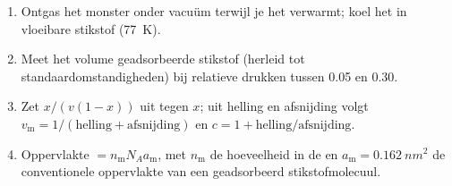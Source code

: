 \begin{method}\label{met:b3:surfaces-catalysis:bet-area}
\begin{enumerate}
  \item Ontgas het monster onder vacuüm terwijl je het verwarmt; koel het in
        vloeibare stikstof (\qty{77}{K}).
  \item Meet het volume geadsorbeerde stikstof (herleid tot
        standaardomstandigheden) bij relatieve drukken tussen 0.05 en 0.30.
  \item Zet $x/(v(1 - x))$ uit tegen $x$; uit helling en afsnijding volgt
        $v_{\mathrm m} = 1/(\text{helling} + \text{afsnijding})$ en $c = 1 + \text{helling}/\text{afsnijding}$.
  \item Oppervlakte $= n_{\mathrm m}N_Aa_{\mathrm m}$, met $n_{\mathrm m}$ de
        hoeveelheid in de  en $a_{\mathrm m} = \qty{0.162}{nm^2}$
        de conventionele oppervlakte van een geadsorbeerd stikstofmolecuul.
\end{enumerate}
\end{method}

